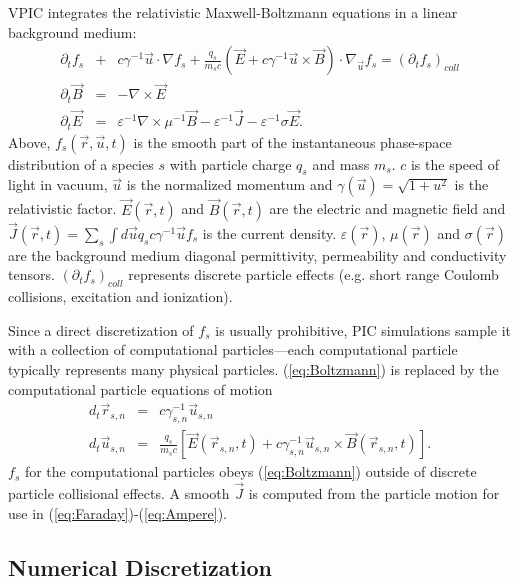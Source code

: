 \documentclass[10pt]{article}
\newcommand{\eps}{\varepsilon}
\newcommand{\vecr}{\vec{r}}
\newcommand{\vecu}{\vec{u}}
\newcommand{\vecJ}{\vec{J}}
\newcommand{\vecE}{\vec{E}}
\newcommand{\vecB}{\vec{B}}
\newcommand{\Deriv}[2]{d_{#2}#1}
\newcommand{\PDeriv}[2]{\partial_{#2}#1}
\newcommand{\DotP}[2]{#1 \cdot #2}
\newcommand{\CrossP}[2]{#1 \times #2}
\newcommand{\Grad}[1]{\nabla #1}
\newcommand{\Curl}[1]{\nabla \times #1}
\newcommand{\Gradu}[1]{\nabla_{\vecu} #1}
\newcommand{\eq}[1]{(\ref{eq:#1})}
\begin{document}
VPIC integrates the relativistic Maxwell-Boltzmann equations in a
linear background medium:
\begin{eqnarray}
\PDeriv{f_s}{t} &+& 
\DotP{c\gamma^{-1}\vecu}{\Grad{f_s}} +
\DotP{\frac{q_s}{m_s c}\left(\vecE+\CrossP{c\gamma^{-1}\vecu}{\vecB}\right)}
{\Gradu{f_s}} = \left(\PDeriv{f_s}{t}\right)_{coll} \label{eq:Boltzmann}\\
\PDeriv{\vecB}{t} &=& -\Curl{\vecE} \label{eq:Faraday}\\
\PDeriv{\vecE}{t} &=&
\eps^{-1}\Curl{\mu^{-1}\vecB} - \eps^{-1}\vecJ - \eps^{-1}\sigma\vecE
\label{eq:Ampere}
.
\end{eqnarray}
Above, $f_s\left(\vecr,\vecu,t\right)$ is the smooth part of the
instantaneous phase-space distribution of a species $s$ with particle
charge $q_s$ and mass $m_s$.  $c$ is the speed of light in vacuum,
$\vecu$ is the normalized momentum and $\gamma\left(\vecu\right) =
\sqrt{1 + u^2}$ is the relativistic factor.
$\vecE\left(\vecr,t\right)$ and $\vecB\left(\vecr,t\right)$ are the
electric and magnetic field and $\vecJ\left(\vecr,t\right) =
\sum_s \int d\vecu q_s c\gamma^{-1}\vecu f_s$ is the current
density.  $\eps\left(\vecr\right)$, $\mu\left(\vecr\right)$ and
$\sigma\left(\vecr\right)$ are the background medium diagonal
permittivity, permeability and conductivity tensors.
$\left(\PDeriv{f_s}{t}\right)_{coll}$ represents discrete
particle effects (e.g. short range Coulomb collisions, excitation and
ionization).

Since a direct discretization of $f_s$ is usually prohibitive, PIC
simulations sample it with a collection of computational
particles---each computational particle typically represents many
physical particles.  \eq{Boltzmann} is replaced by the computational
particle equations of motion
\begin{eqnarray}
\Deriv{\vecr_{s,n}}{t} &=& c \gamma_{s,n}^{-1} \vecu_{s,n} \label{eq:Position}\\
\Deriv{\vecu_{s,n}}{t} &=& \frac{q_s}{m_s c} \left[
\vecE\left(\vecr_{s,n},t\right) +
\CrossP{c\gamma_{s,n}^{-1}\vecu_{s,n}}{\vecB\left(\vecr_{s,n},t\right)}
\right] \label{eq:Momentum}
.
\end{eqnarray}
$f_s$ for the computational particles obeys \eq{Boltzmann} outside of
discrete particle collisional effects.  A smooth $\vecJ$ is computed
from the particle motion for use in \eq{Faraday}-\eq{Ampere}.

\subsection{Numerical Discretization}
\end{document}
